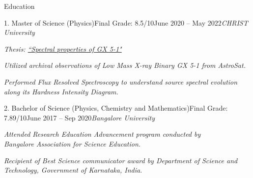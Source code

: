 \vspace{-0.8em}
\begin{section}{Education}

    \begin{subsection}{1. Master of Science (Physics)}{Final Grade: 8.5/10}{June 2020 -- May 2022}{\textit{CHRIST University}}
        \item \emph{Thesis: \href{https://drive.google.com/file/d/1FP9Bz25hufUrWuRfMA0RLzUTm0Spqp-I/view?usp=sharing}{``Spectral properties of GX 5-1"}} %
        \item \textit{Utilized archival observations of Low Mass X-ray Binary GX 5-1 from \textit{AstroSat}.}
        \item \textit{Performed Flux Resolved Spectroscopy to understand source spectral evolution along its Hardness Intensity Diagram.}
    \end{subsection}

    \vspace{-0.5em}

    \begin{subsection}{2. Bachelor of Science (Physics, Chemistry and Mathematics)}{Final Grade: 7.89/10}{June 2017 -- Sep 2020}{\textit{Bangalore University}}
        \item \textit{Attended Research Education Advancement program conducted by \\ Bangalore Association for Science Education.}
        \item \textit{Recipient of Best Science communicator award by Department of Science and Technology, Government of Karnataka, India.}
    \end{subsection}

\end{section}